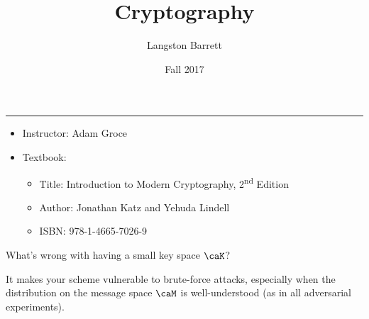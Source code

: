 \documentclass[a5paper]{article}
\begin{document}
\title{Cryptography}
\author{Langston Barrett}
\date{Fall 2017}
\maketitle
\tableofcontents
\vspace{1em}
\hrule
\vspace{1em}

\begin{itemize}
  \item Instructor: Adam Groce
  \item Textbook:
    \begin{itemize}
      \item Title: Introduction to Modern Cryptography, 2\textsuperscript{nd} Edition
      \item Author: Jonathan Katz and Yehuda Lindell
      \item ISBN: 978-1-4665-7026-9
    \end{itemize}
\end{itemize}

\begin{note}
  \begin{field}
    What's wrong with having a small key space $\caK$?
  \end{field}

  \begin{field}
    It makes your scheme vulnerable to brute-force attacks, especially when the
    distribution on the message space $\caM$ is well-understood (as in all
    adversarial experiments).
  \end{field}
\end{note}
\end{document}
